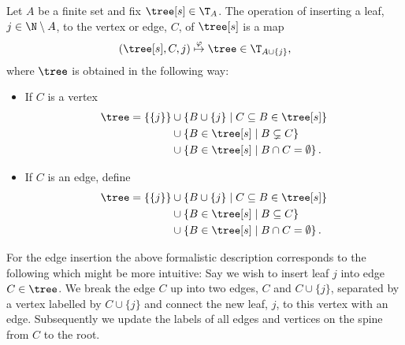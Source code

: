\begin{defi}
    Let $A$ be a finite set and fix $\tree[s] \in \T_A$.
    The operation of inserting a leaf, $j \in \N \setminus A$, to the vertex or edge, $C$, of $\tree[s]$ is a map
    \begin{align}
      \left( \tree[s], C, j \right) \overset{\varphi}{\mapsto} \tree \in \T_{A \cup \left\{ j \right\}},
        \label{insertionsmap}
    \end{align}
    where $\tree$ is obtained in the following way:
    \begin{itemize}
        \item If $C$ is a vertex
            \begin{align*}
                \tree
                =
                \left\{ \left\{ j \right\} \right\}
                &\cup
                \left\{ B \cup \{ j \} \mid C \subseteq B \in \tree[s] \right\} \\
                &\cup
                \left\{ B \in \tree[s] \mid B \subsetneq C \right\} \\
                &\cup
                \left\{ B \in \tree[s] \mid B \cap C = \emptyset \right\}.
            \end{align*}
        \item If $C$ is an edge, define
            \begin{align*}
                \tree
                =
                \left\{ \left\{ j \right\} \right\}
                &\cup
                \left\{ B \cup \{ j \} \mid C \subseteq B \in \tree[s] \right\} \\
                &\cup
                \left\{ B \in \tree[s] \mid B \subseteq C \right\} \\
                &\cup
                \left\{ B \in \tree[s] \mid B \cap C = \emptyset \right\}.
            \end{align*}
    \end{itemize}
\end{defi}
%
For the edge insertion the above formalistic description corresponds to the following which might be more intuitive:
Say we wish to insert leaf $j$ into edge $C \in \tree$.
We break the edge $C$ up into two edges, $C$ and $C \cup \{ j \}$, separated by a vertex labelled by $C \cup \{j\}$ and connect the new leaf, $j$, to this vertex with an edge.
Subsequently we update the labels of all edges and vertices on the spine from $C$ to the root. \\

